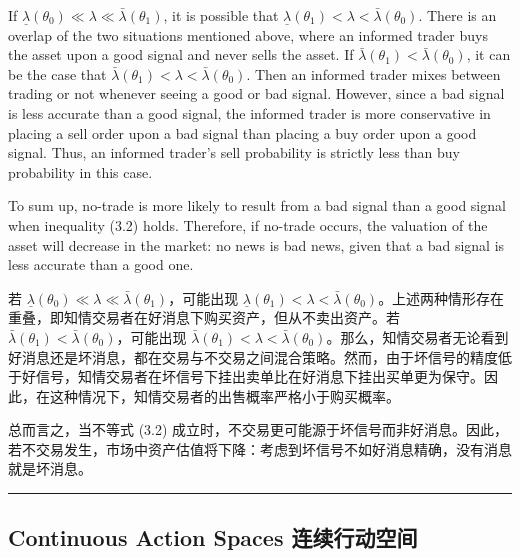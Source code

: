 \documentclass[12pt,a4paper]{article}
\newenvironment{original}{%
  \par\vspace{4pt}\noindent%
  \color{black}%
  \ignorespaces
}{%
  \par\vspace{2pt}%
}
\newenvironment{translation}{%
  \par\vspace{2pt}\noindent%
  \color{transblue}%
  \ignorespaces
}{%
  \par\vspace{4pt}\hrule\vspace{6pt}%
}
\begin{document}
\begin{original}
If $\underline{\lambda}(\theta_0) \ll \lambda \ll \bar{\lambda}(\theta_1)$, it is possible that $\underline{\lambda}(\theta_1) < \lambda < \bar{\lambda}(\theta_0)$. There is an overlap of the two situations mentioned above, where an informed trader buys the asset upon a good signal and never sells the asset. If $\bar{\lambda}(\theta_1) < \bar{\lambda}(\theta_0)$, it can be the case that $\bar{\lambda}(\theta_1) < \lambda < \bar{\lambda}(\theta_0)$. Then an informed trader mixes between trading or not whenever seeing a good or bad signal. However, since a bad signal is less accurate than a good signal, the informed trader is more conservative in placing a sell order upon a bad signal than placing a buy order upon a good signal. Thus, an informed trader's sell probability is strictly less than buy probability in this case.

To sum up, no-trade is more likely to result from a bad signal than a good signal when inequality (3.2) holds. Therefore, if no-trade occurs, the valuation of the asset will decrease in the market: no news is bad news, given that a bad signal is less accurate than a good one.
\end{original}
\begin{translation}
若 $\underline{\lambda}(\theta_0) \ll \lambda \ll \bar{\lambda}(\theta_1)$，可能出现 $\underline{\lambda}(\theta_1) < \lambda < \bar{\lambda}(\theta_0)$。上述两种情形存在重叠，即知情交易者在好消息下购买资产，但从不卖出资产。若 $\bar{\lambda}(\theta_1) < \bar{\lambda}(\theta_0)$，可能出现 $\bar{\lambda}(\theta_1) < \lambda < \bar{\lambda}(\theta_0)$。那么，知情交易者无论看到好消息还是坏消息，都在交易与不交易之间混合策略。然而，由于坏信号的精度低于好信号，知情交易者在坏信号下挂出卖单比在好消息下挂出买单更为保守。因此，在这种情况下，知情交易者的出售概率严格小于购买概率。

总而言之，当不等式 (3.2) 成立时，不交易更可能源于坏信号而非好消息。因此，若不交易发生，市场中资产估值将下降：考虑到坏信号不如好消息精确，没有消息就是坏消息。
\end{translation}

\newpage

\subsection{Continuous Action Spaces \hfill 连续行动空间}
\end{document}

